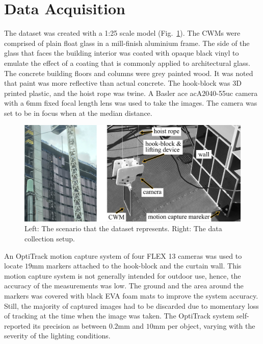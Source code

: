 \documentclass[11pt]{article}
\renewcommand{\figref}[1]{Fig.~\ref{#1}}
\begin{document}
\section*{Data Acquisition}
The dataset was created with a 1:25 scale model (\figref{fig:ExpAndCW}). The CWMs were comprised of plain float glass in a mill-finish aluminium frame. The side of the glass that faces the building interior was coated with opaque black vinyl to emulate the effect of a coating that is commonly applied to architectural glass. The concrete building floors and columns were grey painted wood. It was noted that paint was more reflective than actual concrete. The hook-block was 3D printed plastic, and the hoist rope was twine. A Basler ace acA2040-55uc camera with a 6mm fixed focal length lens was used to take the images. The camera was set to be in focus when at the median distance.

\begin{figure}[t]
	\centering
	\centerline{\includegraphics[width=1\columnwidth,keepaspectratio]{fig/ExperimentalSetupAndCW.pdf}}
	\caption{Left: The scenario that the dataset represents. Right: The data collection setup.}
    \label{fig:ExpAndCW}
\end{figure}

An OptiTrack motion capture system of four FLEX 13 cameras was used to locate $19$mm markers attached to the hook-block and the curtain wall. This motion capture system is not generally intended for outdoor use, hence, the accuracy of the measurements was low. The ground and the area around the markers was covered with black EVA foam mats to improve the system accuracy. Still, the majority of captured images had to be discarded due to momentary loss of tracking at the time when the image was taken. The OptiTrack system self-reported its precision as between $0.2$mm and $10$mm per object, varying with the severity of the lighting conditions.


\FloatBarrier
\end{document}
